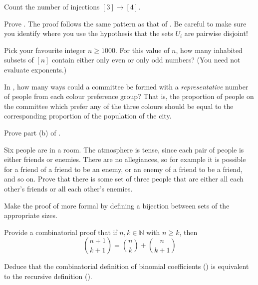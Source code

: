 \begin{exercise}
Count the number of injections $[3] \to [4]$.
\end{exercise}


\begin{exercise}
Prove . The proof follows the same pattern as that of . Be careful to make sure you identify where you use the hypothesis that the sets $U_i$ are pairwise disjoint!
\end{exercise}


\begin{exercise}
Pick your favourite integer $n \ge 1000$. For this value of $n$, how many inhabited subsets of $[n]$ contain either only even or only odd numbers? (You need not evaluate exponents.)
\end{exercise}


\begin{exercise}
\label{exCityColourModified}
In , how many ways could a committee be formed with a \textit{representative} number of people from each colour preference group? That is, the proportion of people on the committee which prefer any of the three colours should be equal to the corresponding proportion of the population of the city.
\end{exercise}


\begin{exercise}
Prove part (b) of .
\end{exercise}


\begin{exercise}
Six people are in a room. The atmosphere is tense, since each pair of people is either friends or enemies. There are no allegiances, so for example it is possible for a friend of a friend to be an enemy, or an enemy of a friend to be a friend, and so on. Prove that there is some set of three people that are either all each other's friends or all each other's enemies.
\end{exercise}


\begin{exercise}
Make the proof of  more formal by defining a bijection between sets of the appropriate sizes.
\end{exercise}

\begin{exercise}
\label{exPascalIdentity}
Provide a combinatorial proof that if $n,k \in \mathbb{N}$ with $n \ge k$, then
\[ \binom{n+1}{k+1} = \binom{n}{k} + \binom{n}{k+1} \]

Deduce that the combinatorial definition of binomial coefficients () is equivalent to the recursive definition ().
\end{exercise}


